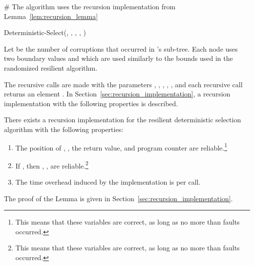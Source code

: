 \documentclass{llncs}
\begin{document}
\newpage








\vspace{10mm}

\begin{algorithm}[H]


\# The algorithm uses the recursion implementation from Lemma~\ref{lem:recursion_lemma} \;

\Return \;

\caption{Deterministic-Select(, , , , )}
\end{algorithm}



\vspace{10mm}






Let  be the number of corruptions that occurred in 's sub-tree. Each node uses two boundary values  and  which are used similarly to the bounds used in the randomized resilient algorithm.

The recursive calls are made with the parameters , , , , , and each recursive call returns an element . In Section~\ref{sec:recursion_implementation}, a recursion implementation with the following properties is described.

\begin{lemma}
\label{lem:recursion_lemma}
There exists a recursion implementation for the resilient deterministic selection algorithm with the following properties:
\begin{enumerate}
	\item
		The position of , , the return value, and program counter are reliable.\footnote{This means that these variables are correct,
		as long as no more than  faults occurred.}
	\item 
		If , then , ,  are reliable.\footnote{This means that these variables are correct,
		as long as no more than  faults occurred.}
	\item
		The time overhead induced by the implementation is  per call.
\end{enumerate}
\end{lemma}
The proof of the Lemma is given in Section~\ref{sec:recursion_implementation}.
\end{document}

